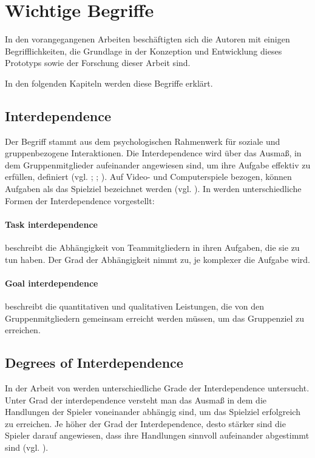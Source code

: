 \section{Wichtige Begriffe}\label{sec:important-topics}
In den vorangegangenen Arbeiten beschäftigten sich die Autoren mit einigen Begrifflichkeiten, die Grundlage in der Konzeption und Entwicklung dieses Prototyps sowie der Forschung dieser Arbeit sind. 

In den folgenden Kapiteln werden diese Begriffe erklärt.

\subsection{Interdependence}
Der Begriff  stammt aus dem psychologischen Rahmenwerk für soziale und gruppenbezogene Interaktionen. Die Interdependence wird über das Ausmaß, in dem Gruppenmitglieder aufeinander angewiesen sind, um ihre Aufgabe effektiv zu erfüllen, definiert (vgl. \citealp[S. 451]{depping_cooperation_2017}; \citealp{saavedra_complex_1993}; \citealp[S. 197:4]{holly_asymmetric_2023}). Auf Video- und Computerspiele bezogen, können Aufgaben als das Spielziel bezeichnet werden (vgl. \citealp[S. 451]{depping_cooperation_2017}). 
In \citealp[S. 52]{van_der_vegt_patterns_2001} werden unterschiedliche Formen der Interdependence vorgestellt:

\paragraph{Task interdependence} beschreibt die Abhängigkeit von Teammitgliedern in ihren Aufgaben, die sie zu tun haben. Der Grad der Abhängigkeit nimmt zu, je komplexer die Aufgabe wird.
\paragraph{Goal interdependence} beschreibt die quantitativen und qualitativen Leistungen, die von den Gruppenmitgliedern gemeinsam erreicht werden müssen, um das Gruppenziel zu erreichen.

\subsection{Degrees of Interdependence}
In der Arbeit von \citealp[S. 7]{harris_asymmetry_2019} werden unterschiedliche Grade der Interdependence untersucht. Unter Grad der interdependence versteht man das Ausmaß in dem die Handlungen der Spieler voneinander abhängig sind, um das Spielziel erfolgreich zu erreichen. Je höher der Grad der Interdependence, desto stärker sind die Spieler darauf angewiesen, dass ihre Handlungen sinnvoll aufeinander abgestimmt sind (vgl. \citealp[S. 7]{harris_asymmetry_2019}).

